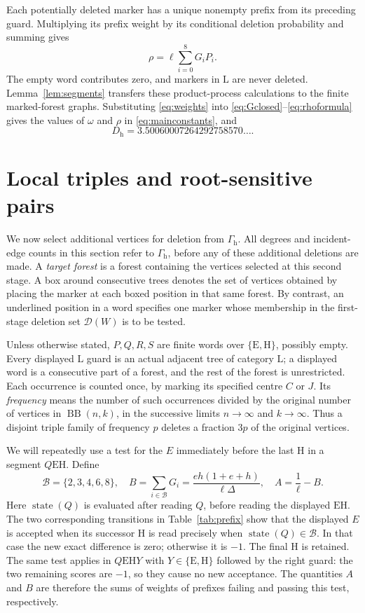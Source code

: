 \documentclass[11pt,a4paper]{article}
\theoremstyle{definition}
\theoremstyle{remark}
\newcommand{\BB}{\operatorname{BB}}
\newcommand{\E}{\mathrm E}
\newcommand{\HH}{\mathrm H}
\newcommand{\LL}{\mathrm L}
\newcommand{\Gh}{\Gamma_{\mathrm h}}
\DeclareMathOperator{\state}{state}
\begin{document}
Each potentially deleted marker has a unique nonempty prefix from its preceding guard. Multiplying its prefix weight by its conditional deletion probability and summing gives
\begin{equation}\label{eq:rhoformula}
\rho=\ell\sum_{i=0}^8G_iP_i.
\end{equation}
The empty word contributes zero, and markers in $\LL$ are never deleted. Lemma~\ref{lem:segments} transfers these product-process calculations to the finite marked-forest graphs. Substituting \eqref{eq:weights} into \eqref{eq:Gclosed}--\eqref{eq:rhoformula} gives the values of $\omega$ and $\rho$ in \eqref{eq:mainconstants}, and
\[
D_{\mathrm h}=3.50060007264292758570\ldots.
\]

\section{Local triples and root-sensitive pairs}\label{sec:gadgets}
We now select additional vertices for deletion from $\Gh$. All degrees and incident-edge counts in this section refer to $\Gh$, before any of these additional deletions are made. A \emph{target forest} is a forest containing the vertices selected at this second stage. A box around consecutive trees denotes the set of vertices obtained by placing the marker at each boxed position in that same forest. By contrast, an underlined position in a word specifies one marker whose membership in the first-stage deletion set $\mathcal D(W)$ is to be tested.

Unless otherwise stated, $P,Q,R,S$ are finite words over $\{\E,\HH\}$, possibly empty. Every displayed $\LL$ guard is an actual adjacent tree of category $\LL$; a displayed word is a consecutive part of a forest, and the rest of the forest is unrestricted. Each occurrence is counted once, by marking its specified centre $C$ or $J$. Its \emph{frequency} means the number of such occurrences divided by the original number of vertices in $\BB(n,k)$, in the successive limits $n\to\infty$ and $k\to\infty$. Thus a disjoint triple family of frequency $p$ deletes a fraction $3p$ of the original vertices.

We will repeatedly use a test for the $E$ immediately before the last $\HH$ in a segment $Q\E\HH$. Define
\begin{equation}\label{eq:AB}
\mathcal B=\{2,3,4,6,8\},\quad
B=\sum_{i\in\mathcal B}G_i=\frac{eh(1+e+h)}{\ell\Delta},\quad
A=\frac1\ell-B.
\end{equation}
Here $\state(Q)$ is evaluated after reading $Q$, before reading the displayed $\E\HH$. The two corresponding transitions in Table~\ref{tab:prefix} show that the displayed $E$ is accepted when its successor $\HH$ is read precisely when $\state(Q)\in\mathcal B$. In that case the new exact difference is zero; otherwise it is $-1$. The final $\HH$ is retained. The same test applies in $Q\E\HH Y$ with $Y\in\{\E,\HH\}$ followed by the right guard: the two remaining scores are $-1$, so they cause no new acceptance. The quantities $A$ and $B$ are therefore the sums of weights of prefixes failing and passing this test, respectively.
\end{document}

